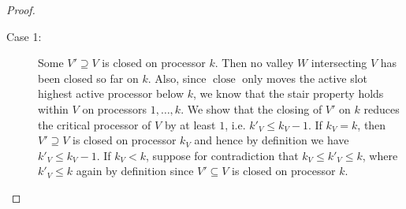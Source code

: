 \documentclass[a4paper]{article}
\DeclareMathOperator{\fillop}{fill}
\DeclareMathOperator{\close}{close}
\DeclareMathOperator{\res}{Res}
\begin{document}
\begin{proof}
  \begin{description}
    \item[Case 1:]
      Some $V' \supseteq V$ is closed on processor $k$.
      Then no valley $W$ intersecting $V$ has been closed so far on $k$.
      Also, since $\close$ only moves the active slot highest active processor below $k$, we know that the stair property  holds within $V$ on processors $1, \ldots, k$.
      We show that the closing of $V'$ on $k$ reduces the critical processor of $V$ by at least $1$, i.e. $k'_V \leq k_V - 1$.
      If $k_V = k$, then $V' \supseteq V$ is closed on processor $k_V$ and hence by definition we have $k'_V \leq k_V - 1$.
      If $k_V < k$, suppose for contradiction that $k_V \leq k'_V \leq k$, where $k'_V \leq k$ again by definition since $V' \subseteq V$ is closed on processor $k$.


\end{description}
\end{proof}
\end{document}

